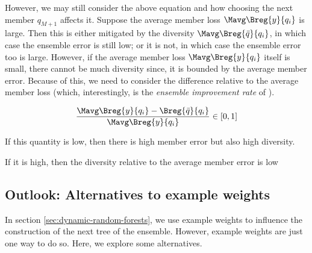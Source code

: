 \documentclass[
    a4paper, %
	fontsize=10pt, %
	twoside=false, %
]{kaobook}
\begin{document}
However, we may still consider the above equation and how choosing the next member $q_{M+1}$ affects it. Suppose the average member loss $\Mavg \Breg{y}{q_{i}}$ is large. Then this is either mitigated by the diversity $\Mavg \Breg{\bar{q}}{q_{i}}$, in which case the ensemble error is still low; or it is not, in which case the ensemble error too is large. 
However, if the average member loss $\Mavg\Breg{y}{q_i}$ itself is small, there cannot be much diversity since, it is bounded by the average member error.  Because of this, we need to consider the difference relative to the average member loss (which, interestingly, is the \textit{ensemble improvement rate} of \cite{theisen}).

$$
\frac{
\Mavg \Breg{y}{q_{i}} - \Breg{\bar{q}}{q_{i}}
}{
\Mavg \Breg{y}{q_i}
}
\in [0,1]
$$


If this quantity is low, then there is high member error but also high diversity. 

If it is high, then the diversity relative to the average member error is low 




\subsection{Outlook: Alternatives to example weights}
In section \ref{sec:dynamic-random-forests}, we use example weights to influence the construction of the next tree of the ensemble. However, example weights are just one way to do so. Here, we explore some alternatives.
\end{document}
